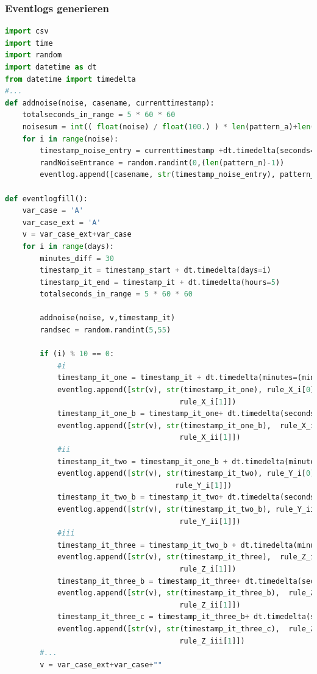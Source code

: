 \subsubsection{Eventlogs generieren}\label{lst:generate}
\small
\begin{lstlisting}[language=Python]
import csv
import time
import random
import datetime as dt
from datetime import timedelta
#...
def addnoise(noise, casename, currenttimestamp):
    totalseconds_in_range = 5 * 60 * 60
    noisesum = int(( float(noise) / float(100.) ) * len(pattern_a)+len(pattern_b))
    for i in range(noise):
        timestamp_noise_entry = currenttimestamp +dt.timedelta(seconds=random.randint(0,totalseconds_in_range))
        randNoiseEntrance = random.randint(0,(len(pattern_n)-1))
        eventlog.append([casename, str(timestamp_noise_entry), pattern_n[randNoiseEntrance][0],  pattern_n[randNoiseEntrance][0]+" "+pattern_n[randNoiseEntrance][1]])
        
def eventlogfill():
    var_case = 'A'
    var_case_ext = 'A'
    v = var_case_ext+var_case
    for i in range(days):
        minutes_diff = 30
        timestamp_it = timestamp_start + dt.timedelta(days=i)
        timestamp_it_end = timestamp_it + dt.timedelta(hours=5)
        totalseconds_in_range = 5 * 60 * 60
        
        addnoise(noise, v,timestamp_it)
        randsec = random.randint(5,55)
    
        if (i) % 10 == 0:
            #i
            timestamp_it_one = timestamp_it + dt.timedelta(minutes=(minutes_diff))
            eventlog.append([str(v), str(timestamp_it_one), rule_X_i[0],  
                                        rule_X_i[1]])
            timestamp_it_one_b = timestamp_it_one+ dt.timedelta(seconds=80+3*randsec)
            eventlog.append([str(v), str(timestamp_it_one_b),  rule_X_ii[0],  
                                        rule_X_ii[1]])
            #ii
            timestamp_it_two = timestamp_it_one_b + dt.timedelta(minutes=(minutes_diff))            
            eventlog.append([str(v), str(timestamp_it_two), rule_Y_i[0],  
                                       rule_Y_i[1]])
            timestamp_it_two_b = timestamp_it_two+ dt.timedelta(seconds=80+3*randsec)        
            eventlog.append([str(v), str(timestamp_it_two_b), rule_Y_ii[0],  
                                        rule_Y_ii[1]])
            #iii
            timestamp_it_three = timestamp_it_two_b + dt.timedelta(minutes=(minutes_diff))        
            eventlog.append([str(v), str(timestamp_it_three),  rule_Z_i[0],  
                                        rule_Z_i[1]])
            timestamp_it_three_b = timestamp_it_three+ dt.timedelta(seconds=80+3*randsec)
            eventlog.append([str(v), str(timestamp_it_three_b),  rule_Z_ii[0],  
                                        rule_Z_ii[1]])
            timestamp_it_three_c = timestamp_it_three_b+ dt.timedelta(seconds=80+3*randsec)
            eventlog.append([str(v), str(timestamp_it_three_c),  rule_Z_iii[0],  
                                        rule_Z_iii[1]])
        #...
        v = var_case_ext+var_case+""
        

\end{lstlisting}
